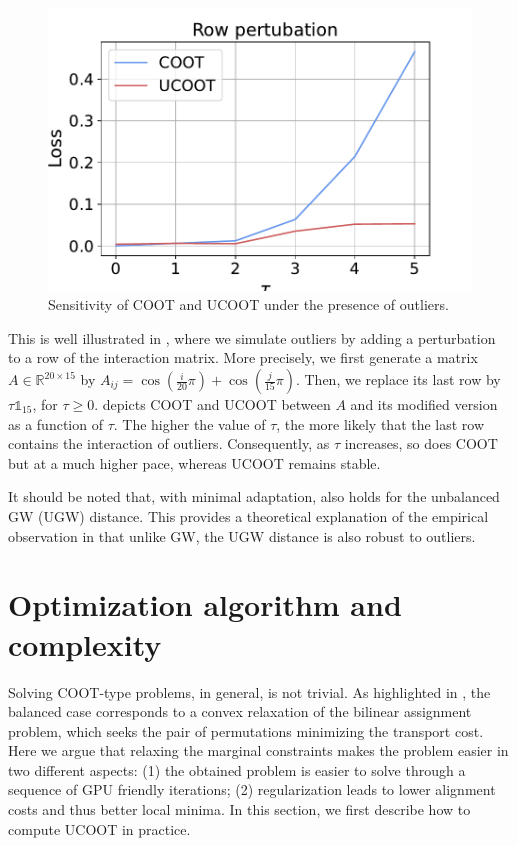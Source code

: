 \setlength{\columnsep}{10pt}%
\setlength{\intextsep}{0pt}
\begin{figure}
  \centering
  \vspace{-10pt}
  \includegraphics[width=\linewidth]{./Chapitre3/fig/robustness_2.pdf}
  \caption{Sensitivity of COOT and UCOOT under the presence of outliers.
  \label{fig:robust}}
\end{figure}
This is well illustrated in ,
where we simulate outliers by adding a perturbation to a row of the interaction matrix.
More precisely, we first generate a matrix $A \in \mathbb R^{20 \times 15}$ by
$A_{ij} = \cos(\frac{i}{20} \pi) + \cos(\frac{j}{15} \pi)$.
Then, we replace its last row by $\tau \mathds 1_{15}$, for $\tau \geq 0$.
 depicts COOT and UCOOT between $A$
and its modified version as a function of $\tau$. The higher the value of $\tau$,
the more likely that the last row contains the interaction of outliers.
Consequently, as $\tau$ increases, so does COOT but at a much higher pace,
whereas UCOOT remains stable.

It should be noted that, with minimal adaptation, 
also holds for the unbalanced GW (UGW) distance.
This provides a theoretical explanation of the empirical observation in \citep{Sejourne20}
that unlike GW, the UGW distance is also robust to outliers.

\section{Optimization algorithm and complexity}
Solving COOT-type problems, in general, is not trivial. As highlighted in \citep{Redko20},
the balanced case corresponds to a convex relaxation of the bilinear assignment problem,
which seeks the pair of permutations minimizing the transport cost.
Here we argue that relaxing the marginal constraints makes the problem easier
in two different aspects: (1) the obtained problem is easier to solve
through a sequence of GPU friendly iterations; (2) regularization leads to lower alignment costs
and thus better local minima. In this section, we first describe how to compute UCOOT in practice.

